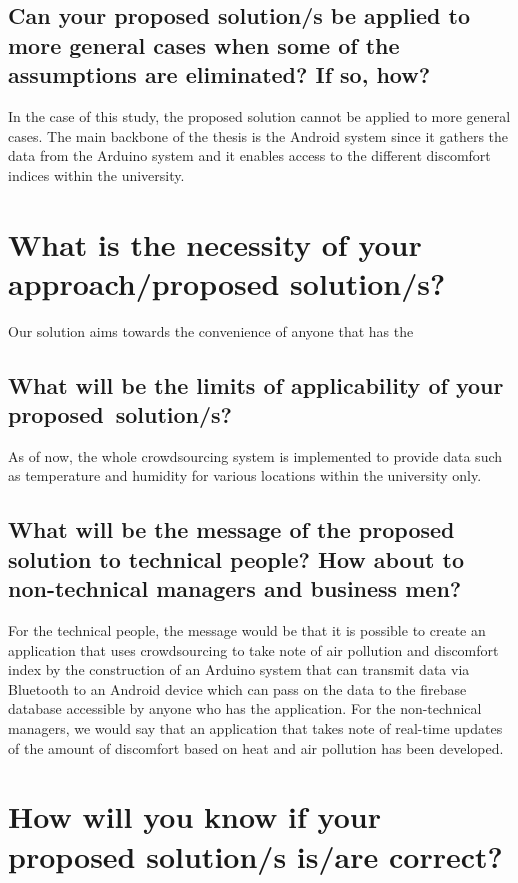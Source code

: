   
\subsection{Can your proposed solution/s be applied to more general cases when some of the assumptions are eliminated? If so, how?}

In the case of this study, the proposed solution cannot be applied to more general cases. The main backbone of the thesis is the Android system since it gathers the data from the Arduino system and it enables access to the different discomfort indices within the university.


\section{What is the necessity of your approach/proposed solution/s?}

Our solution aims towards the convenience of anyone that has the
	
\subsection{What will be the limits of applicability of your proposed~solution/s?}

As of now, the whole crowdsourcing system is implemented to provide data such as temperature and humidity for various locations within the university only.
					  
\subsection{What will be the message of the proposed solution to technical people?  How about to non-technical managers and business men?}
			
For the technical people, the message would be that it is possible to create an application that uses crowdsourcing to take note of air pollution and discomfort index by the construction of an Arduino system that can transmit data via Bluetooth to an Android device which can pass on the data to the firebase database accessible by anyone who has the application. For the non-technical managers, we would say that an application that takes note of real-time updates of the amount of discomfort based on heat and air pollution has been developed.



\section{How will you know if your proposed solution/s is/are correct?}

